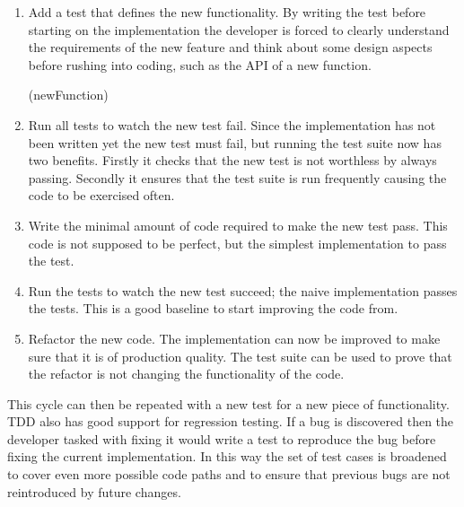 \begin{enumerate}
\item Add a test that defines the new functionality. By writing the test before starting on
	the implementation the developer is forced to clearly understand the requirements of
	the new feature and think about some design aspects before rushing into coding,
	such as the API of a new function.

\functions(newFunction)
\item Run all tests to watch the new test fail. Since the implementation has not been written
	yet the new test must fail, but running the test suite now has two benefits. Firstly
	it checks that the new test is not worthless by always passing. Secondly it ensures
	that the test suite is run frequently causing the code to be exercised often.

\item Write the minimal amount of code required to make the new test pass. This code is not
	supposed to be perfect, but the simplest implementation to pass the test.

\item Run the tests to watch the new test succeed; the naive implementation passes the tests.
	This is a good baseline to start improving the code from.

\item Refactor the new code. The implementation can now be improved to make sure that it is
	of production quality. The test suite can be used to prove that the refactor is not
	changing the functionality of the code.
\end{enumerate}

This cycle can then be repeated with a new test for a new piece of functionality.
TDD also has good support for regression testing. If a bug is discovered then the developer
tasked with fixing it would write a test to reproduce the bug before fixing the current
implementation. In this way the set of test cases is broadened to cover even more
possible code paths and to ensure that previous bugs are not reintroduced by future
changes.

